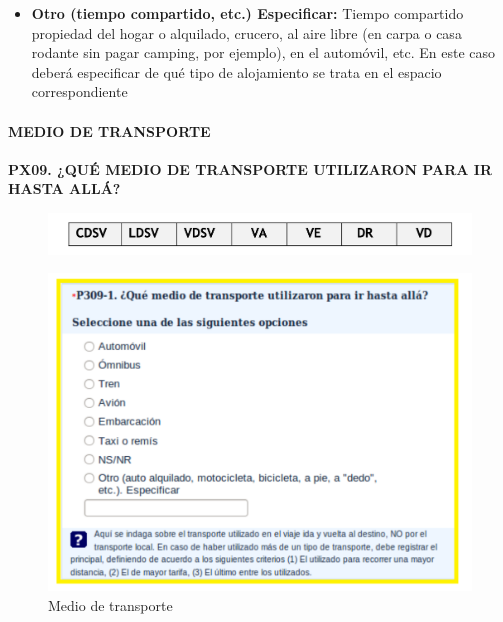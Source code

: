 \documentclass[
  openany]{book}
\begin{document}
\begin{itemize}
\item
  \textbf{Otro (tiempo compartido, etc.) Especificar:} Tiempo compartido propiedad del hogar o alquilado, crucero, al aire libre (en carpa o casa rodante sin pagar camping, por ejemplo), en el automóvil, etc. En este caso deberá especificar de qué tipo de alojamiento se trata en el espacio correspondiente
\end{itemize}

\hypertarget{medio-de-transporte}{%
\paragraph{\texorpdfstring{\textbf{MEDIO DE TRANSPORTE}}{MEDIO DE TRANSPORTE}}\label{medio-de-transporte}}

\textbf{PX09. ¿QUÉ MEDIO DE TRANSPORTE UTILIZARON PARA IR HASTA ALLÁ?}

\begin{figure}

{\centering \includegraphics[width=1\linewidth]{imagenes/figura6-98} 

}

\end{figure}

\begin{figure}

{\centering \includegraphics[width=1\linewidth]{imagenes/figura6-99} 

}

\caption{Medio de transporte}\label{fig:mediodetrans1}
\end{figure}
\end{document}
